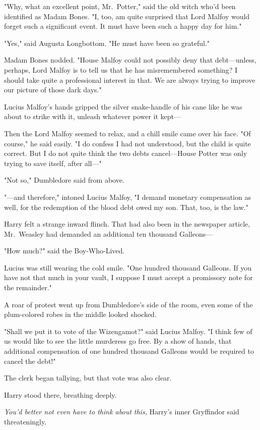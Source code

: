 "Why, what an excellent point, Mr.~Potter," said the old witch who'd been
identified as Madam Bones. "I, too, am quite surprised that Lord Malfoy would
forget such a significant event. It must have been such a happy day for him."

"Yes," said Augusta Longbottom. "He must have been so grateful."

Madam Bones nodded. "House Malfoy could not possibly deny that debt---unless,
perhaps, Lord Malfoy is to tell us that he has misremembered something? I
should take quite a professional interest in that. We are always trying to
improve our picture of those dark days."

Lucius Malfoy's hands gripped the silver snake-handle of his cane like he was
about to strike with it, unleash whatever power it kept---

Then the Lord Malfoy seemed to relax, and a chill smile came over his face. "Of
course," he said easily. "I do confess I had not understood, but the child is
quite correct. But I do not quite think the two debts cancel---House Potter was
only trying to save itself, after all---"

"Not so," Dumbledore said from above.

"---and therefore," intoned Lucius Malfoy, "I demand monetary compensation as
well, for the redemption of the blood debt owed my son. That, too, is the law."

Harry felt a strange inward flinch. That had also been in the newspaper
article, Mr.~Weasley had demanded an additional ten thousand Galleons---

"How much?" said the Boy-Who-Lived.

Lucius was still wearing the cold smile. "One hundred thousand Galleons. If you
have not that much in your vault, I suppose I must accept a promissory note for
the remainder."

A roar of protest went up from Dumbledore's side of the room, even some of the
plum-colored robes in the middle looked shocked.

"Shall we put it to vote of the Wizengamot?" said Lucius Malfoy. "I think few
of us would like to see the little murderess go free. By a show of hands, that
additional compensation of one hundred thousand Galleons would be required to
cancel the debt!"

The clerk began tallying, but that vote was also clear.

Harry stood there, breathing deeply.

\emph{You'd better not even have to think about this,} Harry's inner Gryffindor
said threateningly.

